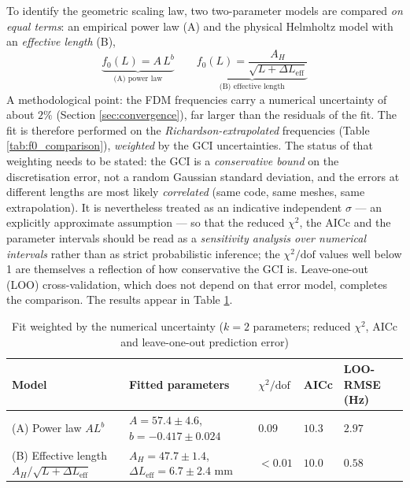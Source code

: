 \documentclass[11pt,a4paper,twocolumn]{article}
\begin{document}
To identify the geometric scaling law, two two-parameter models are compared \emph{on equal terms}: an empirical power law (A) and the physical Helmholtz model with an \emph{effective length} (B),
\begin{equation}
\underbrace{f_0(L) = A\, L^b}_{\text{(A) power law}}
\qquad
\underbrace{f_0(L) = \frac{A_H}{\sqrt{L + \Delta L_{\mathrm{eff}}}}}_{\text{(B) effective length}}
\end{equation}
A methodological point: the FDM frequencies carry a numerical uncertainty of about $2\%$ (Section \ref{sec:convergence}), far larger than the residuals of the fit. The fit is therefore performed on the \emph{Richardson-extrapolated} frequencies (Table \ref{tab:f0_comparison}), \emph{weighted} by the GCI uncertainties. The status of that weighting needs to be stated: the GCI is a \emph{conservative bound} on the discretisation error, not a random Gaussian standard deviation, and the errors at different lengths are most likely \emph{correlated} (same code, same meshes, same extrapolation). It is nevertheless treated as an indicative independent $\sigma$ --- an explicitly approximate assumption --- so that the reduced $\chi^2$, the AICc and the parameter intervals should be read as a \emph{sensitivity analysis over numerical intervals} rather than as strict probabilistic inference; the $\chi^2/\mathrm{dof}$ values well below 1 are themselves a reflection of how conservative the GCI is. Leave-one-out (LOO) cross-validation, which does not depend on that error model, completes the comparison. The results appear in Table \ref{tab:model_selection}.

\begin{table}[t]
\centering
\caption{Fit weighted by the numerical uncertainty ($k=2$ parameters; reduced $\chi^2$, AICc and leave-one-out prediction error)}
\label{tab:model_selection}
\begin{tabular}{>{\raggedright\arraybackslash}p{4.5cm}>{\centering\arraybackslash}p{5cm}>{\centering\arraybackslash}p{1.8cm}>{\centering\arraybackslash}p{1.6cm}>{\centering\arraybackslash}p{2.4cm}}
\toprule
Model & Fitted parameters & $\chi^2/\mathrm{dof}$ & AICc & LOO-RMSE (Hz) \\
\midrule
(A) Power law $A L^b$ & $A=57.4\pm4.6$, \; $b=-0.417\pm0.024$ & $0.09$ & $10.3$ & $2.97$ \\
(B) Effective length $A_H/\sqrt{L+\Delta L_{\mathrm{eff}}}$ & $A_H=47.7\pm1.4$, \; $\Delta L_{\mathrm{eff}}=6.7\pm2.4$ mm & $<0.01$ & $10.0$ & $\mathbf{0.58}$ \\
\bottomrule
\end{tabular}
\end{table}
\end{document}
